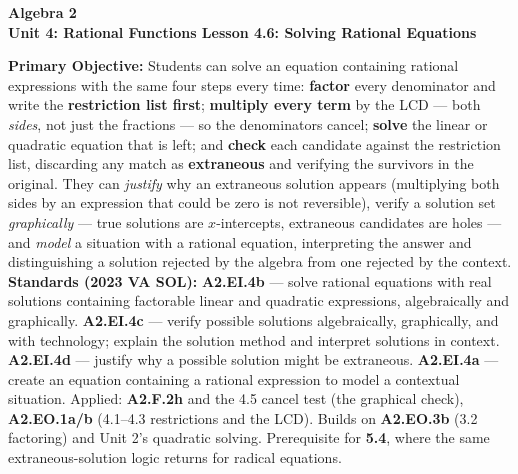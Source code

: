 \documentclass[10pt]{article}
\newcommand{\CourseName}{Algebra 2}
\newcommand{\UnitNumberName}{Unit 4: Rational Functions \quad}
\newcommand{\LessonNumberName}{Lesson 4.6: Solving Rational Equations}
\begin{document}
\begin{center}
    {\Large\bfseries \CourseName \\
    {\small\bfseries \UnitNumberName \LessonNumberName}}
\end{center}

\begin{tcolorbox}[colback=forestbg, colframe=forest, boxrule=0.9pt, arc=2mm,
    left=2mm, right=2mm, top=1.5mm, bottom=1.5mm]
    \textbf{Primary Objective:} Students can solve an equation containing rational expressions with the
    same four steps every time: \textbf{factor} every denominator and write the \textbf{restriction
    list first}; \textbf{multiply every term} by the LCD --- both \emph{sides}, not just the fractions
    --- so the denominators cancel; \textbf{solve} the linear or quadratic equation that is left; and
    \textbf{check} each candidate against the restriction list, discarding any match as
    \textbf{extraneous} and verifying the survivors in the original. They can \emph{justify} why an
    extraneous solution appears (multiplying both sides by an expression that could be zero is not
    reversible), verify a solution set \emph{graphically} --- true solutions are $x$-intercepts,
    extraneous candidates are holes --- and \emph{model} a situation with a rational equation,
    interpreting the answer and distinguishing a solution rejected by the algebra from one rejected by
    the context.
    \\[2pt]
    \textbf{Standards (2023 VA SOL):} \textbf{A2.EI.4b} --- solve rational equations with real
    solutions containing factorable linear and quadratic expressions, algebraically and graphically.
    \textbf{A2.EI.4c} --- verify possible solutions algebraically, graphically, and with technology;
    explain the solution method and interpret solutions in context. \textbf{A2.EI.4d} --- justify why a
    possible solution might be extraneous. \textbf{A2.EI.4a} --- create an equation containing a
    rational expression to model a contextual situation. Applied: \textbf{A2.F.2h} and the 4.5 cancel
    test (the graphical check), \textbf{A2.EO.1a/b} (4.1--4.3 restrictions and the LCD). Builds on
    \textbf{A2.EO.3b} (3.2 factoring) and Unit 2's quadratic solving. Prerequisite for \textbf{5.4},
    where the same extraneous-solution logic returns for radical equations.
\end{tcolorbox}
\end{document}

